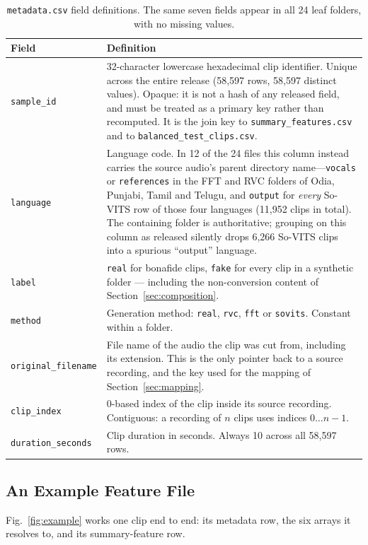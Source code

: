 \documentclass[conference]{IEEEtran}
\begin{document}
\begin{table}[t]
\centering
\caption{\texttt{metadata.csv} field definitions. The same seven fields appear in all 24
leaf folders, with no missing values.}
\label{tab:s7}
\footnotesize
\begin{tabular}{lp{14.2cm}}
\toprule
\textbf{Field} & \textbf{Definition} \\
\midrule
\texttt{sample\_id} & 32-character lowercase hexadecimal clip identifier. Unique across
the entire release (58{,}597 rows, 58{,}597 distinct values). Opaque: it is not a hash of
any released field, and must be treated as a primary key rather than recomputed. It is
the join key to \texttt{summary\_features.csv} and to
\texttt{balanced\_test\_clips.csv}. \\
\texttt{language} & Language code. In 12 of the 24 files this column instead carries the
source audio's parent directory name---\texttt{vocals} or \texttt{references} in the FFT and
RVC folders of Odia, Punjabi, Tamil and Telugu, and \texttt{output} for \emph{every} So-VITS
row of those four languages (11{,}952 clips in total). The containing folder is
authoritative; grouping on this column as released silently drops 6{,}266 So-VITS clips into
a spurious ``output'' language. \\
\texttt{label} & \texttt{real} for bonafide clips, \texttt{fake} for every clip in a
synthetic folder --- including the non-conversion content of
Section~\ref{sec:composition}. \\
\texttt{method} & Generation method: \texttt{real}, \texttt{rvc}, \texttt{fft} or
\texttt{sovits}. Constant within a folder. \\
\texttt{original\_filename} & File name of the audio the clip was cut from, including its
extension. This is the only pointer back to a source recording, and the key used for the
mapping of Section~\ref{sec:mapping}. \\
\texttt{clip\_index} & 0-based index of the clip inside its source recording. Contiguous:
a recording of $n$ clips uses indices $0\ldots n-1$. \\
\texttt{duration\_seconds} & Clip duration in seconds. Always 10 across all 58{,}597
rows. \\
\bottomrule
\end{tabular}
\end{table}

\subsection{An Example Feature File}
Fig.~\ref{fig:example} works one clip end to end: its metadata row, the six arrays it
resolves to, and its summary-feature row.
\end{document}

